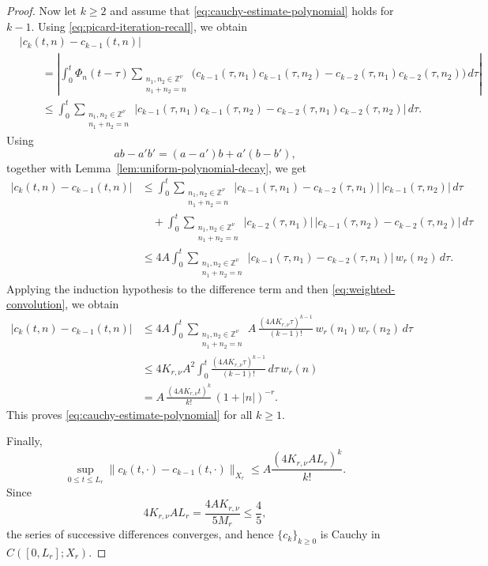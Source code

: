 \documentclass[12pt,reqno,tbtags]{amsart}
\newcommand\1{\mathbbm{1}}
\begin{document}
\begin{proof}
Now let $k\ge2$ and assume that \eqref{eq:cauchy-estimate-polynomial} holds for $k-1$.
Using \eqref{eq:picard-iteration-recall}, we obtain
\begin{align*}
&|c_k(t,n)-c_{k-1}(t,n)| \\
&\qquad=
\left|
\int_0^t \Phi_n(t-\tau)
\sum_{\substack{n_1,n_2\in\mathbb Z^\nu\\ n_1+n_2=n}}
\Big(
c_{k-1}(\tau,n_1)c_{k-1}(\tau,n_2)
-
c_{k-2}(\tau,n_1)c_{k-2}(\tau,n_2)
\Big)\,d\tau
\right| \\
&\qquad\le
\int_0^t
\sum_{\substack{n_1,n_2\in\mathbb Z^\nu\\ n_1+n_2=n}}
\big|
c_{k-1}(\tau,n_1)c_{k-1}(\tau,n_2)
-
c_{k-2}(\tau,n_1)c_{k-2}(\tau,n_2)
\big|\,d\tau.
\end{align*}
Using
\[
ab-a'b'=(a-a')b+a'(b-b'),
\]
together with Lemma~\ref{lem:uniform-polynomial-decay}, we get
\begin{align*}
|c_k(t,n)-c_{k-1}(t,n)|
&\le
\int_0^t
\sum_{\substack{n_1,n_2\in\mathbb Z^\nu\\ n_1+n_2=n}}
|c_{k-1}(\tau,n_1)-c_{k-2}(\tau,n_1)|\,|c_{k-1}(\tau,n_2)|\,d\tau \\
&\quad+
\int_0^t
\sum_{\substack{n_1,n_2\in\mathbb Z^\nu\\ n_1+n_2=n}}
|c_{k-2}(\tau,n_1)|\,|c_{k-1}(\tau,n_2)-c_{k-2}(\tau,n_2)|\,d\tau \\
&\le
4A\int_0^t
\sum_{\substack{n_1,n_2\in\mathbb Z^\nu\\ n_1+n_2=n}}
|c_{k-1}(\tau,n_1)-c_{k-2}(\tau,n_1)|\,w_r(n_2)\,d\tau.
\end{align*}
Applying the induction hypothesis to the difference term and then
\eqref{eq:weighted-convolution}, we obtain
\begin{align*}
|c_k(t,n)-c_{k-1}(t,n)|
&\le
4A\int_0^t
\sum_{\substack{n_1,n_2\in\mathbb Z^\nu\\ n_1+n_2=n}}
A\,
\frac{(4AK_{r,\nu}\tau)^{k-1}}{(k-1)!}\,
w_r(n_1)w_r(n_2)\,d\tau \\
&\le
4K_{r,\nu}A^2
\int_0^t
\frac{(4AK_{r,\nu}\tau)^{k-1}}{(k-1)!}\,d\tau\,
w_r(n) \\
&=
A\,
\frac{(4AK_{r,\nu} t)^k}{k!}\,
(1+|n|)^{-r}.
\end{align*}
This proves \eqref{eq:cauchy-estimate-polynomial} for all $k\ge1$.

Finally,
\[
\sup_{0\le t\le L_r}\|c_k(t,\cdot)-c_{k-1}(t,\cdot)\|_{X_r}
\le
A\frac{(4K_{r,\nu}AL_r)^k}{k!}.
\]
Since
\[
4K_{r,\nu}AL_r
=
\frac{4AK_{r,\nu}}{5M_r}
\le
\frac45,
\]
the series of successive differences converges, and hence $\{c_k\}_{k\ge0}$ is
Cauchy in $C([0,L_r];X_r)$.
\end{proof}
\end{document}
